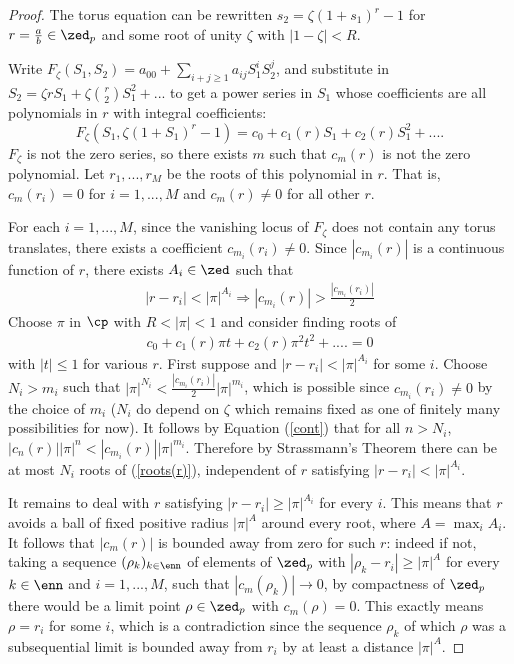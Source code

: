 \documentclass[12pt,letterpaper]{article}
\begin{document}
	\begin{proof}
		The torus equation can be rewritten $s_2 = \zeta(1+s_1)^r-1$ for $r = \frac{a}{b}\in \zed_p$ and some root of unity $\zeta$ with $|1-\zeta|<R$.
		
		Write $F_\zeta(S_1,S_2) = a_{00}+\sum_{i+j\geq 1}a_{ij}S_1^iS_2^j$, and substitute in $S_2 = \zeta rS_1 + \zeta\binom{r}{2} S_1^2 + ...$ to get a power series in $S_1$ whose coefficients are all polynomials in $r$ with integral coefficients:
		\[F_\zeta(S_1,\zeta(1+S_1)^r-1) = c_0 + c_1(r)S_1 + c_2(r) S_1^2 + ... .\]		
		$F_\zeta$ is not the zero series, so there exists $m$ such that $c_m(r)$ is not the zero polynomial. Let $r_{1},...,r_M$ be the roots of this polynomial in $r$. That is, $c_m(r_i)=0$ for $i=1,...,M$ and $c_m(r)\ne0$ for all other $r$.
		
		For each $i=1,...,M$, since the vanishing locus of $F_\zeta$ does not contain any torus translates, there exists a coefficient $c_{m_i}(r_i)\ne0$. Since $|c_{m_i}(r)|$ is a continuous function of $r$, there exists $A_i\in \zed$ such that
		\begin{align}\label{cont}
			|r-r_i|<|\pi|^{A_i}\Rightarrow |c_{m_i}(r)|>\frac{|c_{m_i}(r_i)|}{2}\end{align}	
		Choose $\pi$ in $\cp$ with $R<|\pi|<1$ and consider finding roots of 
		\begin{align}\label{roots(r)}
			c_0 + c_1(r)\pi t + c_2(r)\pi^2t^2 + .... =0
		\end{align}		
		with $|t|\leq 1$ for various $r$. First suppose and $|r-r_i|<|\pi|^{A_i}$ for some $i$. Choose $N_i>m_i$ such that $|\pi|^{N_i}< \frac{|c_{m_i}(r_i)|}{2}|\pi|^{m_i}$, which is possible since $c_{m_i}(r_i)\ne0$ by the choice of $m_i$ ($N_i$ do depend on $\zeta$ which remains fixed as one of finitely many possibilities for now). It follows by Equation (\ref{cont}) that for all $n>N_i$, $|c_n(r)||\pi|^n<|c_{m_i}(r)||\pi|^{m_i}$. Therefore by Strassmann's Theorem there can be at most $N_i$ roots of (\ref{roots(r)}), independent of $r$ satisfying $|r-r_i|<|\pi|^{A_i}$.
		
		It remains to deal with $r$ satisfying $|r-r_i|\geq|\pi|^{A_i}$ for every $i$. This means that $r$ avoids a ball of fixed positive radius $|\pi|^A$ around every root, where $A=\max_i{A_i}$. It follows that $|c_{m}(r)|$ is bounded away from zero for such $r$: indeed if not, taking a sequence $(\rho_k)_{k\in \enn}$ of elements of $\zed_p$ with $|\rho_k-r_i|\geq |\pi|^{A}$ for every $k\in \enn$ and $i= 1,...,M$, such that $|c_{m}(\rho_k)|\to 0$, by compactness of $\zed_p$ there would be a limit point $\rho\in \zed_p$ with $c_{m}(\rho)=0$. This exactly means $\rho = r_i$ for some $i$, which is a contradiction since the sequence $\rho_k$ of which $\rho$ was a subsequential limit is bounded away from $r_i$ by at least a distance $|\pi|^{A}$. 
		

\end{proof}
\end{document}

